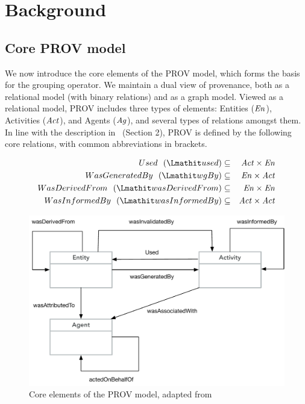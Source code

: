 
\section{Background}
\label{sec:prov-background}

\subsection{Core PROV model} \label{sec:prov-core}

We now introduce the core elements of the PROV model, which forms the basis for the grouping operator.
%
We maintain a dual view of provenance, both as a relational model (with binary relations) and as a graph model. Viewed as a relational model, PROV includes three types of elements: Entities ($\mathit{En}$), Activities ($\mathit{Act}$), and Agents ($\mathit{Ag}$), and several types of relations amongst them. 
In line with the description in~\citep{w3c-prov-dm} (Section 2), PROV is defined by the following core relations, with common abbreviations in brackets. 

\begin{eqnarray*}
Used~~(\used)  & \subseteq & \act \times \en \\
WasGeneratedBy~~(\wgby) & \subseteq  & \en \times \act \\
WasDerivedFrom~~(\wdf) & \subseteq   & \en \times \en \\
WasInformedBy~~(\wasInfBy) & \subseteq & \act \times \act
\end{eqnarray*}


\begin{figure}
\centering
\includegraphics[scale=.45]{figures/prov-essentials.pdf} 
\caption{Core elements of the PROV model, adapted from~\citep{w3c-prov-dm}}
\label{fig:prov-core}
\end{figure}


